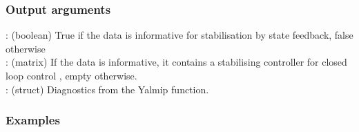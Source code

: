 \subsubsection*{Output arguments}
\textbf{}: (boolean) True if the data is informative for stabilisation by state feedback, false otherwise\\
\textbf{}: (matrix) If the data is informative, it contains a stabilising controller  for closed loop control , empty otherwise.\\
\textbf{}: (struct) Diagnostics from the Yalmip  function.

\subsubsection{Examples}